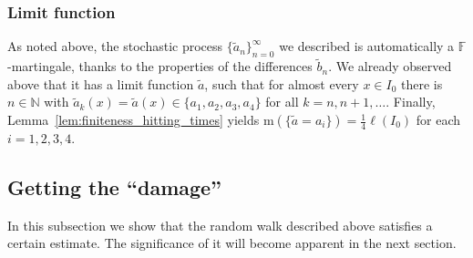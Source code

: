 \documentclass{amsart}
\newcommand{\N}{\mathbb{N}}
\newcommand{\wt}{\widetilde}
\theoremstyle{definition}
\theoremstyle{remark}
\begin{document}
\subsubsection{Limit function}

As noted above, the stochastic process $\{\wt{a}_n\}^{\infty}_{n=0}$ we described is automatically a $\mathbb{F}$-martingale, thanks to the properties of the differences $\wt{b}_n$. We already observed above that it has a limit function $\wt{a}$, such that for almost every $x\in I_0$ there is $n\in\N$ with $\wt{a}_k(x)=\wt{a}(x)\in\{a_1,a_2,a_3,a_4\}$ for all $k=n,n+1,\ldots$. Finally, Lemma~\ref{lem:finiteness_hitting_times} yields $\mathrm{m}(\{\wt{a}=a_i\})=\frac{1}{4}\ell(I_0)$ for each $i=1,2,3,4$.

\subsection{Getting the ``damage''}
\label{subs:one_block_damage}

In this subsection we show that the random walk described above satisfies a certain estimate. The significance of it will become apparent in the next section.
\end{document}
